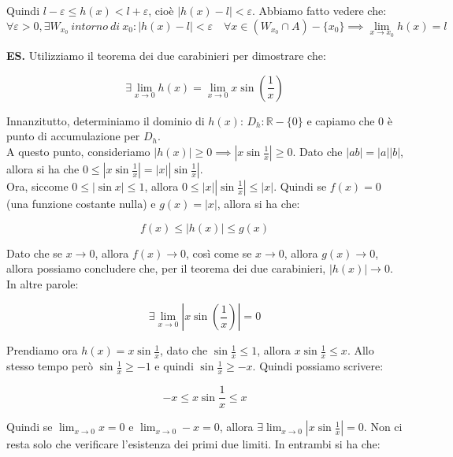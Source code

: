 \documentclass{article}
\begin{document}
\noindent Quindi $l - \varepsilon \leq h(x) < l + \varepsilon$, cioè $|h(x) - l| < \varepsilon$. Abbiamo fatto vedere che:
\begin{equation*}
    \forall \varepsilon > 0, \exists W_{x_0} \ intorno \ di \ x_0 : |h(x) - l| < \varepsilon \quad \forall x \in (W_{x_0} \cap A) - \{x_0\} \implies \lim_{x \to x_0} h(x) = l
\end{equation*}

\noindent\textbf{ES.} Utilizziamo il teorema dei due carabinieri per dimostrare che:

\begin{equation*}
    \exists \lim_{x \to 0} h(x) = \lim_{x \to 0} x\sin\left(\frac{1}{x}\right)
\end{equation*}

\noindent Innanzitutto, determiniamo il dominio di $h(x)$: $D_h: \mathbb{R} - \{0\}$ e capiamo che $0$ è punto di accumulazione per $D_h$.\\
A questo punto, consideriamo $|h(x)| \geq 0 \implies |x \sin \frac{1}{x}| \geq 0$. Dato che $|ab| = |a||b|$, allora si ha che $0 \leq |x\sin\frac{1}{x}| = |x||\sin\frac{1}{x}|$.\\
Ora, siccome $0 \leq |\sin x| \leq 1$, allora $0 \leq |x||\sin\frac{1}{x}| \leq |x|$. Quindi se $f(x) = 0$ (una funzione costante nulla) e $g(x) = |x|$, allora si ha che:

\begin{equation*}
    f(x) \leq |h(x)| \leq g(x)
\end{equation*}

\noindent Dato che se $x \to 0$, allora $f(x) \to 0$, così come se $x \to 0$, allora $g(x) \to 0$, allora possiamo concludere che, per il teorema dei due carabinieri, $|h(x)| \to 0$. In altre parole:

\begin{equation*}
    \exists \lim_{x \to 0} \left|x\sin\left(\frac{1}{x}\right)\right| = 0
\end{equation*}

\noindent Prendiamo ora $h(x) = x\sin\frac{1}{x}$, dato che $\sin\frac{1}{x} \leq 1$, allora $x\sin\frac{1}{x} \leq x$. Allo stesso tempo però $\sin\frac{1}{x} \geq -1$ e quindi $\sin\frac{1}{x} \geq -x$. Quindi possiamo scrivere:

\begin{equation*}
    -x \leq x\sin\frac{1}{x} \leq x
\end{equation*}

\noindent Quindi se $\lim_{x \to 0} x = 0$ e $\lim_{x \to 0} -x = 0$, allora $\exists \lim_{x \to 0} |x\sin\frac{1}{x}| = 0$. Non ci resta solo che verificare l'esistenza dei primi due limiti. In entrambi si ha che:
\end{document}
